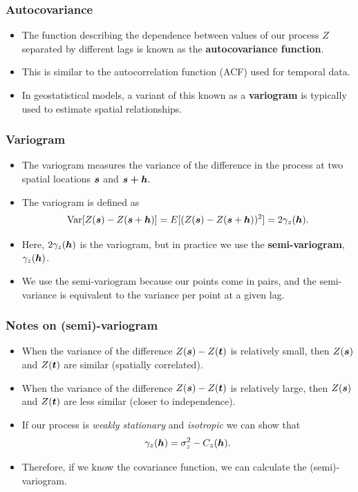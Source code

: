 \documentclass[parskip,12pt]{beamer}
\newcommand{\bd}[1]{\ensuremath{\mbox{\boldmath $#1$}}}
\begin{document}
\begin{frame}
\frametitle{Autocovariance}
 \begin{itemize}
\item The function describing the dependence between values of our process $Z$ separated by different lags is known as the \textbf{autocovariance function}.
\vspace{3mm}
\item This is similar to the autocorrelation function (ACF) used for temporal data.
\vspace{3mm}
\item In geostatistical models, a variant of this known as a \textbf{variogram} is typically used to estimate spatial relationships.
\end{itemize}
\end{frame}


\begin{frame}
\frametitle{Variogram}
 \begin{itemize}
\item The variogram measures the variance of the difference in the process at two spatial locations $\bd{s}$ and $\bd{s+h}.$
\vspace{3mm}
\item The variogram is defined as $$\mbox{Var}[Z(\bd{s}) - Z(\bd{s} + \bd{h})] = E[(Z(\bd{s}) - Z(\bd{s} + \bd{h}))^2] = 2\gamma_z(\bd{h}).$$
\vspace{-2mm}
\item Here, $2\gamma_z(\bd{h})$ is the variogram, but in practice we use the \textbf{semi-variogram}, $\gamma_z(\bd{h})$.
\vspace{3mm}
\item We use the semi-variogram because our points come in pairs, and the semi-variance is equivalent to the variance per point at a given lag.
\end{itemize}
\end{frame}

\begin{frame}
\frametitle{Notes on (semi)-variogram}
 \begin{itemize}
\item When the variance of the difference $Z(\bd{s}) - Z(\bd{t})$ is relatively small, then $Z(\bd{s})$ and $Z(\bd{t})$ are similar (spatially correlated).
\vspace{3mm}
\item When the variance of the difference $Z(\bd{s}) - Z(\bd{t})$ is relatively large, then $Z(\bd{s})$ and $Z(\bd{t})$ are less similar (closer to independence).
\vspace{3mm}
\item If our process is \emph{weakly stationary} and \emph{isotropic} we can show that $$\gamma_z(\bd{h}) = \sigma^2_z - C_z(\bd{h}).$$
\vspace{-1mm}
\item Therefore, if we know the covariance function, we can calculate the (semi)-variogram.
\end{itemize}
\end{frame}
  
\end{document}

